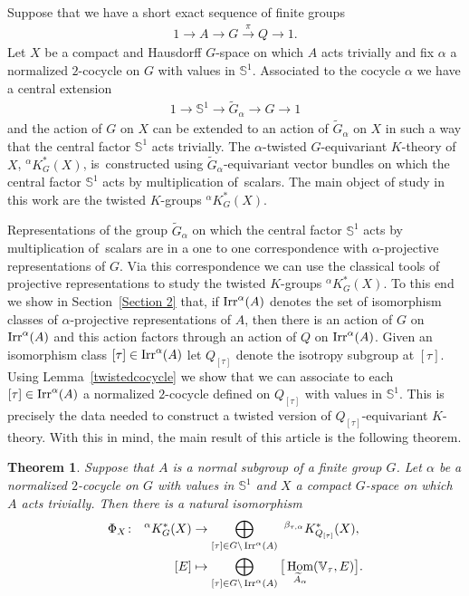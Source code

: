 \documentclass[pdftex]{sigma}
\def\S{\mathbb{S}}
\def\V{\mathbb{V}}
\DeclareMathOperator{\Hom}{\textup{Hom}}
\DeclareMathOperator{\Irr}{\textup{Irr}}
\newtheorem{Th}{Theorem}[section]
\theoremstyle{definition}
\numberwithin{equation}{section}
\begin{document}
Suppose that we have a short exact sequence of finite groups
\begin{gather*}
1\rightarrow A\rightarrow G\stackrel{\pi}{\rightarrow} Q\rightarrow 1.
\end{gather*}
Let $X$ be a compact and Hausdorff $G$-space on which $A$ acts trivially and fix
$\alpha$ a normalized $2$-cocycle on $G$ with values in $\S^{1}$. Associated to the
cocycle $\alpha$ we have a central extension
\begin{gather*}
1\rightarrow \S^{1}\rightarrow
\widetilde{G}_{\alpha}\rightarrow G\rightarrow 1
\end{gather*}
and the action of $G$ on $X$ can be extended to an action of $\widetilde{G}_{\alpha}$ on $X$
in such a way that the central factor $\S^{1}$ acts trivially. The $\alpha$-twisted
$G$-equivariant $K$-theory of $X$, $^{\alpha}K^{\ast}_{G}(X)$, is~constructed
\mbox{using} $\widetilde{G}_{\alpha}$-equivariant vector bundles on which the central factor
$\S^{1}$ acts by multiplication of~scalars. The main object of study in this work are
the twisted $K$-groups $^{\alpha}K^{\ast}_{G}(X)$.

Representations of the group
$\widetilde{G}_{\alpha}$ on which the central factor $\S^{1}$
acts by multiplication of~sca\-lars are in a one to one correspondence
with $\alpha$-projective representations of $G$. Via this correspondence we can use
the classical tools of projective representations to study the twisted $K$-groups
$^{\alpha}K^{\ast}_{G}(X)$. To this end we show in Section~\ref{Section 2} that,
if $\Irr^{\alpha}(A)$ denotes the set of isomorphism classes of $\alpha$-projective
representations of $A$, then there is an action of $G$ on $\Irr^{\alpha}(A)$
and this action factors through an action of $Q$ on $\Irr^{\alpha}(A)$.
Given an isomorphism class $[\tau]\in \Irr^{\alpha}(A)$ let
$Q_{[\tau]}$ denote the isotropy subgroup at $[\tau]$. Using Lemma~\ref{twistedcocycle}
we show that we can associate to each $[\tau]\in \Irr^{\alpha}(A)$
a normalized $2$-cocycle defined on $Q_{[\tau]}$ with values in $\S^{1}$. This is
precisely the data needed to construct a twisted version of $Q_{[\tau]}$-equivariant
$K$-theory. With this in mind, the main result of this article is the following theorem.

\begin{Th}\label{main}
Suppose that $A$ is a normal subgroup of a finite group $G$. Let $\alpha$
be a normalized $2$-cocycle on $G$ with values in $\S^{1}$ and $X$ a
compact $G$-space on which $A$ acts trivially.
Then there is a natural isomorphism
\begin{align*}
\Phi_{X}\colon \ \phantom{i}^{\alpha}K_{G}^{\ast}(X)&\rightarrow
\bigoplus_{[\tau]\in G\backslash \Irr^{\alpha}(A)}\phantom{i}
^{\beta_{\tau,\alpha}}K^{\ast}_{Q_{[\tau]}}(X),
\\
[E]&\mapsto \bigoplus_{[\tau]\in G\backslash \Irr^{\alpha}(A)}
\big[\Hom_{\widetilde{A}_{\alpha}}(\V_{\tau},E)\big].
\end{align*}
\end{Th}
\end{document}
